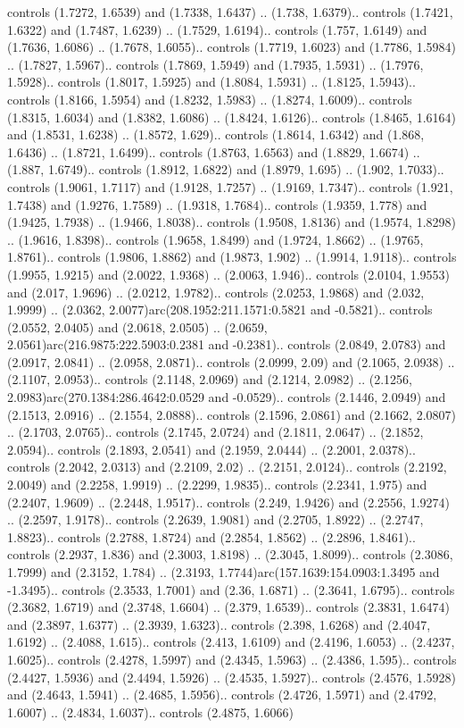 controls (1.7272, 1.6539) and (1.7338, 1.6437) .. (1.738, 1.6379).. controls (1.7421, 1.6322) and (1.7487, 1.6239) .. (1.7529, 1.6194).. controls (1.757, 1.6149) and (1.7636, 1.6086) .. (1.7678, 1.6055).. controls (1.7719, 1.6023) and (1.7786, 1.5984) .. (1.7827, 1.5967).. controls (1.7869, 1.5949) and (1.7935, 1.5931) .. (1.7976, 1.5928).. controls (1.8017, 1.5925) and (1.8084, 1.5931) .. (1.8125, 1.5943).. controls (1.8166, 1.5954) and (1.8232, 1.5983) .. (1.8274, 1.6009).. controls (1.8315, 1.6034) and (1.8382, 1.6086) .. (1.8424, 1.6126).. controls (1.8465, 1.6164) and (1.8531, 1.6238) .. (1.8572, 1.629).. controls (1.8614, 1.6342) and (1.868, 1.6436) .. (1.8721, 1.6499).. controls (1.8763, 1.6563) and (1.8829, 1.6674) .. (1.887, 1.6749).. controls (1.8912, 1.6822) and (1.8979, 1.695) .. (1.902, 1.7033).. controls (1.9061, 1.7117) and (1.9128, 1.7257) .. (1.9169, 1.7347).. controls (1.921, 1.7438) and (1.9276, 1.7589) .. (1.9318, 1.7684).. controls (1.9359, 1.778) and (1.9425, 1.7938) .. (1.9466, 1.8038).. controls (1.9508, 1.8136) and (1.9574, 1.8298) .. (1.9616, 1.8398).. controls (1.9658, 1.8499) and (1.9724, 1.8662) .. (1.9765, 1.8761).. controls (1.9806, 1.8862) and (1.9873, 1.902) .. (1.9914, 1.9118).. controls (1.9955, 1.9215) and (2.0022, 1.9368) .. (2.0063, 1.946).. controls (2.0104, 1.9553) and (2.017, 1.9696) .. (2.0212, 1.9782).. controls (2.0253, 1.9868) and (2.032, 1.9999) .. (2.0362, 2.0077)arc(208.1952:211.1571:0.5821 and -0.5821).. controls (2.0552, 2.0405) and (2.0618, 2.0505) .. (2.0659, 2.0561)arc(216.9875:222.5903:0.2381 and -0.2381).. controls (2.0849, 2.0783) and (2.0917, 2.0841) .. (2.0958, 2.0871).. controls (2.0999, 2.09) and (2.1065, 2.0938) .. (2.1107, 2.0953).. controls (2.1148, 2.0969) and (2.1214, 2.0982) .. (2.1256, 2.0983)arc(270.1384:286.4642:0.0529 and -0.0529).. controls (2.1446, 2.0949) and (2.1513, 2.0916) .. (2.1554, 2.0888).. controls (2.1596, 2.0861) and (2.1662, 2.0807) .. (2.1703, 2.0765).. controls (2.1745, 2.0724) and (2.1811, 2.0647) .. (2.1852, 2.0594).. controls (2.1893, 2.0541) and (2.1959, 2.0444) .. (2.2001, 2.0378).. controls (2.2042, 2.0313) and (2.2109, 2.02) .. (2.2151, 2.0124).. controls (2.2192, 2.0049) and (2.2258, 1.9919) .. (2.2299, 1.9835).. controls (2.2341, 1.975) and (2.2407, 1.9609) .. (2.2448, 1.9517).. controls (2.249, 1.9426) and (2.2556, 1.9274) .. (2.2597, 1.9178).. controls (2.2639, 1.9081) and (2.2705, 1.8922) .. (2.2747, 1.8823).. controls (2.2788, 1.8724) and (2.2854, 1.8562) .. (2.2896, 1.8461).. controls (2.2937, 1.836) and (2.3003, 1.8198) .. (2.3045, 1.8099).. controls (2.3086, 1.7999) and (2.3152, 1.784) .. (2.3193, 1.7744)arc(157.1639:154.0903:1.3495 and -1.3495).. controls (2.3533, 1.7001) and (2.36, 1.6871) .. (2.3641, 1.6795).. controls (2.3682, 1.6719) and (2.3748, 1.6604) .. (2.379, 1.6539).. controls (2.3831, 1.6474) and (2.3897, 1.6377) .. (2.3939, 1.6323).. controls (2.398, 1.6268) and (2.4047, 1.6192) .. (2.4088, 1.615).. controls (2.413, 1.6109) and (2.4196, 1.6053) .. (2.4237, 1.6025).. controls (2.4278, 1.5997) and (2.4345, 1.5963) .. (2.4386, 1.595).. controls (2.4427, 1.5936) and (2.4494, 1.5926) .. (2.4535, 1.5927).. controls (2.4576, 1.5928) and (2.4643, 1.5941) .. (2.4685, 1.5956).. controls (2.4726, 1.5971) and (2.4792, 1.6007) .. (2.4834, 1.6037).. controls (2.4875, 1.6066) 